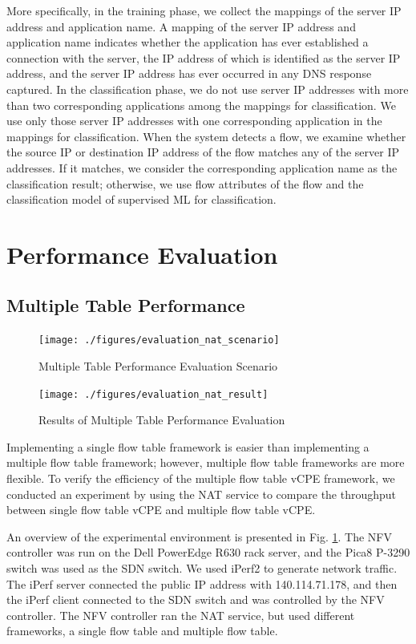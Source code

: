 \documentclass[10pt,journal]{IEEEtran}
\begin{document}
More specifically, in the training phase, we collect the mappings of the server IP address and application name. A mapping of the server IP address and application name indicates whether the application has ever established a connection with the server, the IP address of which is identified as the server IP address, and the server IP address has ever occurred in any DNS response captured. In the classification phase, we do not use server IP addresses with more than two corresponding applications among the mappings for classification. We use only those server IP addresses with one corresponding application in the mappings for classification. When the system detects a flow, we examine whether the source IP or destination IP address of the flow matches any of the server IP addresses. If it matches, we consider the corresponding application name as the classification result; otherwise, we use flow attributes of the flow and the classification model of supervised ML for classification.





\section{Performance Evaluation}
\subsection{Multiple Table Performance}

\begin{figure}[!t]
\centering
\texttt{[image: ./figures/evaluation\_nat\_scenario]}
\caption{Multiple Table Performance Evaluation Scenario}
\label{fig:evaluation_nat_scenario}
\end{figure}

\begin{figure}[!t]
\centering
\texttt{[image: ./figures/evaluation\_nat\_result]}
\caption{Results of Multiple Table Performance Evaluation}
\label{fig:evaluation_nat_result}
\end{figure}

Implementing a single flow table framework is easier than implementing a multiple flow table framework; however, multiple flow table frameworks are more flexible. To verify the efficiency of the multiple flow table vCPE framework, we conducted an experiment by using the NAT service to compare the throughput between single flow table vCPE and multiple flow table vCPE.

An overview of the experimental environment is presented in Fig. \ref{fig:evaluation_nat_scenario}. The NFV controller was run on the Dell PowerEdge R630 rack server, and the Pica8 P-3290 switch \cite{pica8-switch} was used as the SDN switch. We used iPerf2 \cite{iperf} to generate network traffic. The iPerf server connected the public IP address with 140.114.71.178, and then the iPerf client connected to the SDN switch and was controlled by the NFV controller. The NFV controller ran the NAT service, but used different frameworks, a single flow table and multiple flow table.
\end{document}
